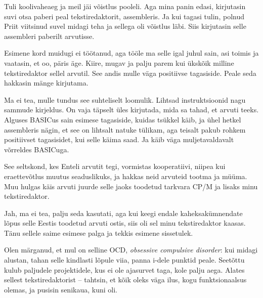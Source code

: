 Tuli koolivaheaeg ja meil jäi võistlus pooleli. Aga mina panin edasi, kirjutasin suvi 
otsa paberi peal tekstiredaktorit, assembleris. Ja kui tagasi tulin, 
polnud Priit viitsinud suvel midagi teha ja sellega oli võistlus 
läbi. Siis kirjutasin selle assembleri paberilt arvutisse.


Esimene kord muidugi ei töötanud, aga tööle ma selle igal juhul sain, asi 
toimis ja vaatasin, et oo, päris äge. Kiire, mugav ja 
palju parem kui ükskõik milline tekstiredaktor sellel arvutil. See andis mulle 
väga positiivse tagasiside. Peale seda hakkasin mänge kirjutama.


Ma ei tea, mulle tundus see suhteliselt loomulik. Lihtsad instruktsioonid nagu sammude kirjeldus. On 
vaja täpselt üles kirjutada, mida sa tahad, et arvuti teeks. Alguses BASICus sain esimese 
tagasiside, kuidas tsükkel käib, ja ühel hetkel assembleris nägin, et see on 
lihtsalt natuke tülikam, aga teisalt pakub rohkem positiivset tagasisidet, kui selle käima saad. Ja käib väga muljetavaldavalt võrreldes 
BASICuga. 


See seltskond, kes Enteli arvutit tegi, 
vormistas kooperatiivi, niipea kui eraettevõtlus muutus seaduslikuks, ja 
hakkas neid arvuteid tootma ja müüma. Muu hulgas käis arvuti juurde 
selle jaoks toodetud tarkvara CP/M ja lisaks minu tekstiredaktor.


Jah, ma ei tea, palju seda kasutati, aga kui keegi endale kaheksakümnendate lõpus 
selle Eestis toodetud arvuti ostis, siis oli sel minu tekstiredaktor kaasas. 
Tänu sellele saime esimese palga ja tekkis esimene 
sissetulek.


Olen märganud, et mul on selline 
OCD, \emph{obsessive compulsive disorder}: kui midagi alustan, tahan selle 
kindlasti lõpule viia, panna i-dele punktid peale. Seetõttu kulub paljudele 
projektidele, kus ei ole ajasurvet taga, kole palju aega. Alates sellest 
tekstiredaktorist -- tahtsin, et kõik oleks väga ilus, kogu funktsionaalsus 
olemas, ja pusisin senikaua, kuni oli. 

